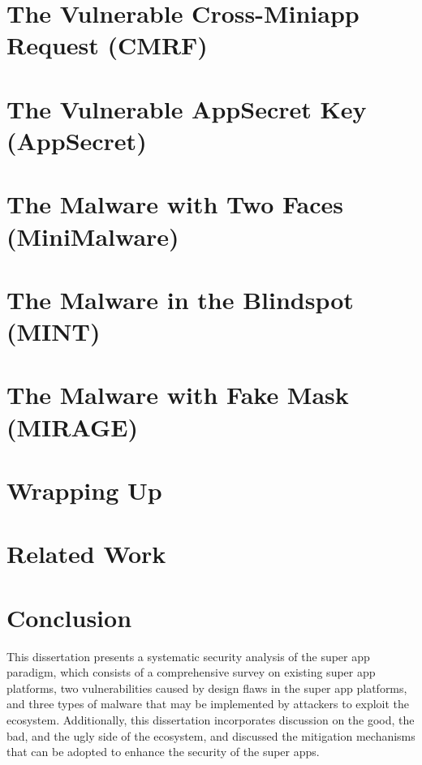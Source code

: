 \documentclass{osudissert96}
\begin{document}
\chapter{The Vulnerable Cross-Miniapp Request (CMRF)}


\chapter{The Vulnerable AppSecret Key (AppSecret)}


\chapter{The Malware with Two Faces (MiniMalware)}


\chapter{The Malware in the Blindspot (MINT)}


\chapter{The Malware with Fake Mask (MIRAGE)}


\chapter{Wrapping Up}


\chapter{Related Work}


\chapter{Conclusion}


This dissertation presents a systematic security analysis of the super app paradigm, which consists of a comprehensive survey on existing super app platforms, two vulnerabilities caused by design flaws in the super app platforms, and three types of malware that may be implemented by attackers to exploit the ecosystem. Additionally, this dissertation incorporates discussion on the good, the bad, and the ugly side of the ecosystem, and discussed the mitigation mechanisms that can be adopted to enhance the security of the super apps.
\end{document}
